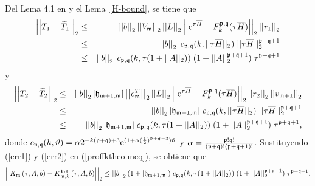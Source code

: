 Del Lema 4.1 en \cite{jimenez2012convergence} y el Lema~\ref{H-bound}, se tiene que
\begin{eqnarray}
\left\lvert\left\lvert T_1 - \widetilde{T}_1\right\rvert\right\rvert_2
&\leq& \left\lvert \left\lvert b \right\rvert \right\rvert_2 \left\lvert\left\lvert  V_{\mathfrak{m}} \right\rvert\right\rvert_2 \left\lvert\left\lvert  L \right\rvert\right\rvert_2 \left\lvert\left\lvert \mathrm{e}^{\tau  \overline{H}}-F_k^{\mathfrak{p},\mathfrak{q}}(\tau \overline{H}) \right\rvert\right\rvert_2
\left\lvert\left\lvert  r_1 \right\rvert\right\rvert_2 \nonumber\\
&\leq& \left\lvert \left\lvert b \right\rvert \right\rvert_2 \;  c_{\mathfrak{p},\mathfrak{q}}(k,\lvert\lvert\tau\overline{H}\rvert\rvert_2) \;
\lvert\lvert\tau \overline{H}\rvert\rvert_2^{\mathfrak{p}+\mathfrak{q}+1}\nonumber\\
&\leq& \left\lvert \left\lvert b \right\rvert \right\rvert_2 \; c_{\mathfrak{p},\mathfrak{q}}(k,\tau (1+\lvert\lvert A \rvert\rvert_2))
\; (1 + \lvert\lvert A \rvert\rvert_2^{\mathfrak{p}+\mathfrak{q}+1}) \; \tau^{\mathfrak{p}+\mathfrak{q}+1}
\label{err1}
\end{eqnarray}
y
\begin{eqnarray}
\left\lvert\left\lvert T_2 - \widetilde{T}_2 \right\rvert\right\rvert_2
&\leq& \left\lvert \left\lvert b \right\rvert \right\rvert_2 \lvert \mathfrak{h}_{\mathfrak{m}+1,\mathfrak{m}}\rvert \left\lvert\left\lvert  e_{\mathfrak{m}}^T \right\rvert\right\rvert_2 \left\lvert\left\lvert  L \right\rvert\right\rvert_2 \left\lvert\left\lvert \mathrm{e}^{\tau \overline{H}}-
F_k^{\mathfrak{p},\mathfrak{q}}(\tau \overline{H}) \right\rvert\right\rvert_2  \left\lvert\left\lvert  r_2 \right\rvert\right\rvert_2 \left\lvert\left\lvert v_{\mathfrak{m}+1}\right\rvert\right\rvert_2 \nonumber\\
&\leq&\left\lvert \left\lvert b \right\rvert \right\rvert_2 \lvert \mathfrak{h}_{\mathfrak{m}+1,\mathfrak{m}}\rvert \; c_{\mathfrak{p},\mathfrak{q}}
(k,\lvert\lvert\tau \overline{H}\rvert\rvert_2) \;
\lvert\lvert\tau \overline{H}\rvert\rvert_2^{\mathfrak{p}+\mathfrak{q}+1}\nonumber\\
&\leq& \left\lvert \left\lvert b \right\rvert \right\rvert_2 \lvert \mathfrak{h}_{\mathfrak{m}+1,\mathfrak{m}}\rvert \; c_{\mathfrak{p},\mathfrak{q}}(k,\tau (1+\lvert\lvert A \rvert\rvert_2))
\; (1 + \lvert\lvert A \rvert\rvert_2^{\mathfrak{p}+\mathfrak{q}+1}) \; \tau^{\mathfrak{p}+\mathfrak{q}+1}\label{err2},
\end{eqnarray}
donde $c_{\mathfrak{p},\mathfrak{q}}(k,\vartheta )=\alpha
2^{-k(\mathfrak{p}+\mathfrak{q})+3}\mathrm{e}^{(1+\alpha(\frac{1}{2})^{\mathfrak{p}+\mathfrak{q}-3})\vartheta }$ y $%
\alpha =\frac{\pf!\qf!}{(\pf+\qf)!(\pf+\qf+1)!}$. Sustituyendo (\ref{err1}) y (\ref{err2}) en (\ref{proffktheouneq}), se obtiene que
\begin{equation}
\left\lvert\left\lvert   K_{\mathfrak{m}}\left( \tau , A , b \right) -
K_{\mathfrak{m},k}^{\mathfrak{p},\mathfrak{q}}\left( \tau, A , b \right) \right\rvert\right\rvert_2
\leq \left\lvert \left\lvert b \right\rvert \right\rvert_2 (1+\lvert\mathfrak{h}_{\mathfrak{m}+1,\mathfrak{m}}\rvert) \; c_{\mathfrak{p},\mathfrak{q}}(k,\tau (1+\lvert\lvert A \rvert\rvert_2))
\; (1 + \lvert\lvert A \rvert\rvert_2^{\mathfrak{p}+\mathfrak{q}+1}) \; \tau^{\mathfrak{p}+\mathfrak{q}+1}. \label{errp1}
\end{equation}

